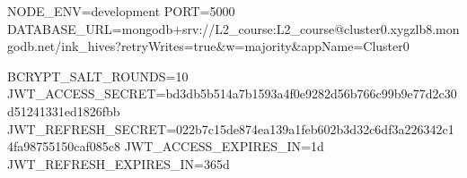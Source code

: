NODE_ENV=development
PORT=5000
DATABASE_URL=mongodb+srv://L2_course:L2_course@cluster0.xygzlb8.mongodb.net/ink_hives?retryWrites=true&w=majority&appName=Cluster0

BCRYPT_SALT_ROUNDS=10
JWT_ACCESS_SECRET=bd3db5b514a7b1593a4f0e9282d56b766c99b9e77d2c30d51241331ed1826fbb
JWT_REFRESH_SECRET=022b7c15de874ea139a1feb602b3d32c6df3a226342c14fa98755150caf085c8
JWT_ACCESS_EXPIRES_IN=1d
JWT_REFRESH_EXPIRES_IN=365d